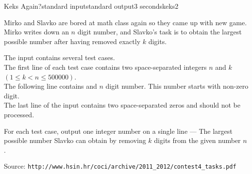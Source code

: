 \begin{problem}{Keks Again?}{standard input}{standard output}{3 seconds}{keks2}

Mirko and Slavko are bored at math class again so they came up with new game. Mirko writes down an $n$ digit number, and Slavko’s task is to obtain the largest possible number after having removed exactly $k$ digits.

\InputFile

The input contains several test cases.\\
The first line of each test case contains two space-separated integers $n$ and $k$ $(1 \leq k < n \leq 500 000)$.\\
The following line contains and $n$ digit number. This number starts with non-zero digit.\\
The last line of the input contains two space-separated zeros and should not be processed.

\OutputFile

For each test case, output one integer number on a single line --- The largest possible number Slavko can obtain by removing $k$ digits from the given number $n$.

\Example

\begin{example}
%
\end{example}

Source: \verb|http://www.hsin.hr/coci/archive/2011_2012/contest4_tasks.pdf|

\end{problem}
